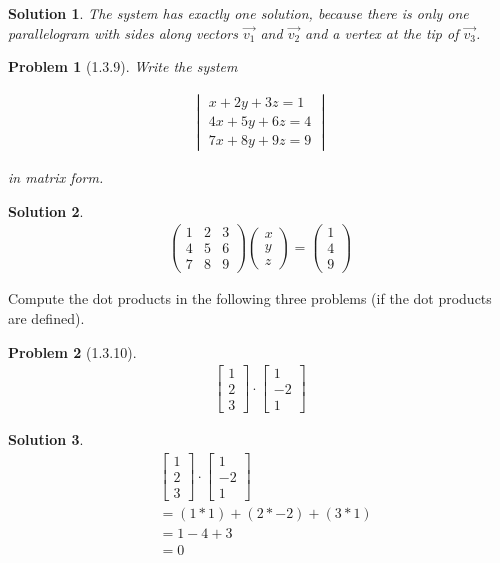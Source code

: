 \documentclass{article}
\newtheorem{problem}{Problem}
\newtheorem*{solution}{Solution}
\begin{document}
\begin{solution}
The system has exactly one solution, because there is only one parallelogram with sides along vectors $\vec{v_{1}}$ and $\vec{v_{2}}$ and a vertex at the tip of $\vec{v_{3}}$. 
\end{solution}

\begin{problem}[1.3.9]
Write the system 

\begin{align*}
\begin{vmatrix}
x + 2y + 3z = 1 \\
4x + 5y + 6z = 4 \\
7x + 8y + 9z = 9
\end{vmatrix}
\end{align*}

in matrix form.
\end{problem}

\begin{solution}
\begin{align*}
\begin{pmatrix}
1 & 2 & 3 \\
4 & 5 & 6 \\ 
7 & 8 & 9 
\end{pmatrix}
\begin{pmatrix}
x \\ y \\ z
\end{pmatrix}
=
\begin{pmatrix}
1\\ 4 \\ 9
\end{pmatrix}
\end{align*}
\end{solution}

Compute the dot products in the following three problems (if the dot products are defined).

\begin{problem}[1.3.10] 
\begin{align*}
\begin{bmatrix}
1 \\ 2 \\ 3
\end{bmatrix}
\cdot
\begin{bmatrix}
1 \\ -2 \\ 1
\end{bmatrix}
\end{align*}
\end{problem}

\begin{solution}
\begin{align*}
&\begin{bmatrix}
1 \\ 2 \\ 3
\end{bmatrix}
\cdot
\begin{bmatrix}
1 \\ -2 \\ 1
\end{bmatrix} \\
&= (1 * 1) + (2 * -2) + (3 * 1) \\
&=1 - 4 + 3 \\
&= 0
\end{align*}

\end{solution}
\end{document}
